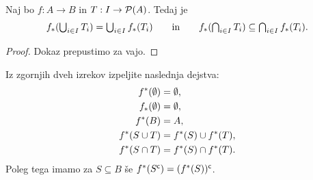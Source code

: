 \begin{izrek}
  Naj bo $f : A \to B$ in $T : I \to \mathcal{P}(A)$. Tedaj je
  \begin{equation*}
    \img{f} (\Union{i \in I} T_i) = \Union{i \in I} \img{f}(T_i)
    \iinn
    \img{f} (\Inter{i \in I} T_i) \subseteq \Inter{i \in I} \img{f}(T_i).
  \end{equation*}
\end{izrek}

\begin{proof}
  Dokaz prepustimo za vajo.
\end{proof}

\begin{vaja}
  Iz zgornjih dveh izrekov izpeljite naslednja dejstva:
  \begin{align*}
    f^{*}(\emptyset) &= \emptyset, \\
    f_{*}(\emptyset) &= \emptyset, \\
    f^{*}(B) &= A, \\
    f^{*}(S \cup T) &= f^{*}(S) \cup f^{*}(T), \\
    f^{*}(S \cap T) &= f^{*}(S) \cap f^{*}(T).
  \end{align*}
  Poleg tega imamo za $S \subseteq B$ še $f^{*}(S^{\mathsf{c}}) = (f^{*}(S))^{\mathsf{c}}$.
\end{vaja}
